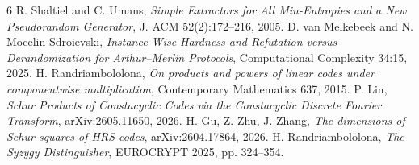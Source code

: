 \documentclass[11pt]{article}
\begin{document}
\begin{thebibliography}{6}
 R. Shaltiel and C. Umans, \emph{Simple Extractors for All Min-Entropies and a New Pseudorandom Generator}, J. ACM 52(2):172--216, 2005.
 D. van Melkebeek and N. Mocelin Sdroievski, \emph{Instance-Wise Hardness and Refutation versus Derandomization for Arthur--Merlin Protocols}, Computational Complexity 34:15, 2025.
 H. Randriambololona, \emph{On products and powers of linear codes under componentwise multiplication}, Contemporary Mathematics 637, 2015.
 P. Lin, \emph{Schur Products of Constacyclic Codes via the Constacyclic Discrete Fourier Transform}, arXiv:2605.11650, 2026.
 H. Gu, Z. Zhu, J. Zhang, \emph{The dimensions of Schur squares of HRS codes}, arXiv:2604.17864, 2026.
 H. Randriambololona, \emph{The Syzygy Distinguisher}, EUROCRYPT 2025, pp. 324--354.
\end{thebibliography}
\end{document}
